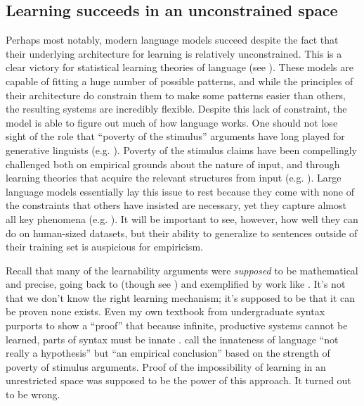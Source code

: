 \documentclass[output=paper,colorlinks,citecolor=brown
]{langscibook}
\begin{document}
\subsection{Learning succeeds in an unconstrained space}

Perhaps most notably, modern language models succeed despite the fact that their underlying architecture for learning is relatively unconstrained. This is a clear victory for statistical learning theories of language (see \cite{contreras2023large}). These models are capable of fitting a huge number of possible patterns, and while the principles of their architecture do constrain them to make some patterns easier than others, the resulting systems are incredibly flexible. Despite this lack of constraint, the model is able to figure out much of how language works. One should not lose sight of the role that ``poverty of the stimulus'' arguments have long played for generative linguists (e.g. \cite{lasnik2016argument,crain2001nature,legate2002empirical,wexler1980formal,laurence2001poverty,pearl2022poverty,crain2002language}). Poverty of the stimulus claims have been compellingly challenged both on empirical grounds about the nature of input, and through learning theories that acquire the relevant structures from input (e.g. \cite{pullum2002empirical,clark2010linguistic,perfors2011learnability,reali2005uncovering,solan2005unsupervised}). Large language models essentially lay this issue to rest because they come with none of the constraints that others have insisted are necessary, yet they capture almost all key phenomena (e.g. \cite{wilcox2022using}). It will be important to see, however, how well they can do on human-sized datasets, but their ability to generalize to sentences outside of their training set is auspicious for empiricism.

Recall that many of the learnability arguments were \emph{supposed} to be mathematical and precise, going back to \cite{gold1967language} (though see \cite{johnson2004gold,chater2007ideal}) and exemplified by work like \cite{wexler1980formal}. It's not that we don't know the right learning mechanism; it's supposed to be that it can be proven none exists. Even my own textbook from undergraduate syntax purports to show a ``proof'' that because infinite, productive systems cannot be learned, parts of syntax must be innate \citep{carnie2021syntax}. \cite{legate2002empirical} call the innateness of language ``not really a hypothesis'' but ``an empirical conclusion'' based on the strength of poverty of stimulus arguments. Proof of the impossibility of learning in an unrestricted space was supposed to be the power of this approach. It turned out to be wrong.
\end{document}
